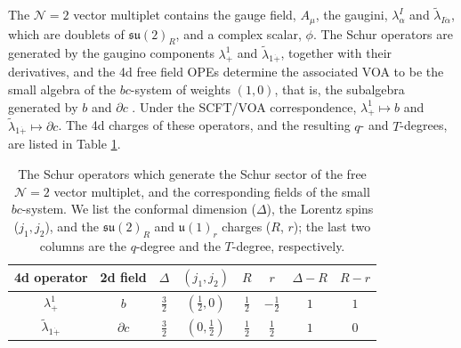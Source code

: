 \documentclass[12pt]{article}
\numberwithin{equation}{section}
\numberwithin{figure}{section}
\theoremstyle{plain}
\theoremstyle{definition}
\begin{document}
The $\mathcal{N}=2$ vector multiplet contains the gauge field, $A_\mu$, the gaugini, $\lambda^I_\alpha$ and $\widetilde{\lambda}_{I\dot{\alpha}}$, which are doublets of $\mathfrak{su}(2)_R$, and a complex scalar, $\phi$. The Schur operators are generated by the gaugino components $\lambda^1_+$ and $\widetilde{\lambda}_{1\dot{+}}$, together with their derivatives, and the 4d free field OPEs determine the associated VOA to be the small algebra of the $bc$-system of weights $(1, 0)$, that is, the subalgebra generated by $b$ and $\partial c$ \cite{Beem:2013sza}. Under the SCFT/VOA correspondence, $\lambda^1_+ \mapsto b$ and $\widetilde{\lambda}_{1\dot{+}} \mapsto \partial c$. The 4d charges of these operators, and the resulting $q$- and $T$-degrees, are listed in Table \ref{tbl:vec}.

\begin{table}[H]
    \centering
    \begin{threeparttable}
    \begin{tabular}{cccccccc}
        \toprule
        4d operator & 2d field & $\Delta$ & $(j_1, j_2)$ & $R$ & $r$ & $\Delta - R$ & $R - r$ \\\midrule
        $\lambda^1_+$ & $b$ & $\frac{3}{2}$ & $(\frac{1}{2}, 0)$ & $\frac{1}{2}$ & $-\frac{1}{2}$ & $1$ & $1$ \\[3pt]
        $\widetilde{\lambda}_{1\dot{+}}$ & $\partial c$ & $\frac{3}{2}$ & $(0, \frac{1}{2})$ & $\frac{1}{2}$ & $\frac{1}{2}$ & $1$ & $0$ \\\bottomrule
    \end{tabular}
    \end{threeparttable}
    \caption{The Schur operators which generate the Schur sector of the free $\mathcal{N}=2$ vector multiplet, and the corresponding fields of the small $bc$-system. We list the conformal dimension ($\Delta$), the Lorentz spins ($j_1, j_2$), and the $\mathfrak{su}(2)_R$ and $\mathfrak{u}(1)_r$ charges ($R$, $r$); the last two columns are the $q$-degree and the $T$-degree, respectively.}
    \label{tbl:vec}
\end{table}
\end{document}
